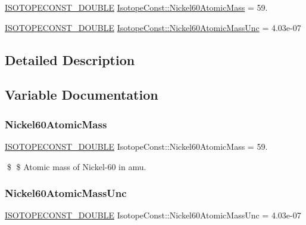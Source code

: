 \begin{DoxyCompactItemize}
\item 
\mbox{\hyperlink{group___isotope_const-_macros_ga8f45a7272ce02c0b4c65c44636ed719a}{I\+S\+O\+T\+O\+P\+E\+C\+O\+N\+S\+T\+\_\+\+D\+O\+U\+B\+LE}} \mbox{\hyperlink{group___isotope_const-_nickel-_ni60_gaee82de91531a8b2e56522253c4ad1e9e}{Isotope\+Const\+::\+Nickel60\+Atomic\+Mass}} = 59.
\item 
\mbox{\hyperlink{group___isotope_const-_macros_ga8f45a7272ce02c0b4c65c44636ed719a}{I\+S\+O\+T\+O\+P\+E\+C\+O\+N\+S\+T\+\_\+\+D\+O\+U\+B\+LE}} \mbox{\hyperlink{group___isotope_const-_nickel-_ni60_ga352f771616eef8d8d8fad82c0174c530}{Isotope\+Const\+::\+Nickel60\+Atomic\+Mass\+Unc}} = 4.\+03e-\/07
\end{DoxyCompactItemize}


\subsection{Detailed Description}


\subsection{Variable Documentation}
\mbox{\label{group___isotope_const-_nickel-_ni60_gaee82de91531a8b2e56522253c4ad1e9e}} 
\subsubsection{\texorpdfstring{Nickel60\+Atomic\+Mass}{Nickel60AtomicMass}}
{\footnotesize\ttfamily \mbox{\hyperlink{group___isotope_const-_macros_ga8f45a7272ce02c0b4c65c44636ed719a}{I\+S\+O\+T\+O\+P\+E\+C\+O\+N\+S\+T\+\_\+\+D\+O\+U\+B\+LE}} Isotope\+Const\+::\+Nickel60\+Atomic\+Mass = 59.}

\$ \$ Atomic mass of Nickel-\/60 in amu. \mbox{\label{group___isotope_const-_nickel-_ni60_ga352f771616eef8d8d8fad82c0174c530}} 
\subsubsection{\texorpdfstring{Nickel60\+Atomic\+Mass\+Unc}{Nickel60AtomicMassUnc}}
{\footnotesize\ttfamily \mbox{\hyperlink{group___isotope_const-_macros_ga8f45a7272ce02c0b4c65c44636ed719a}{I\+S\+O\+T\+O\+P\+E\+C\+O\+N\+S\+T\+\_\+\+D\+O\+U\+B\+LE}} Isotope\+Const\+::\+Nickel60\+Atomic\+Mass\+Unc = 4.\+03e-\/07}

